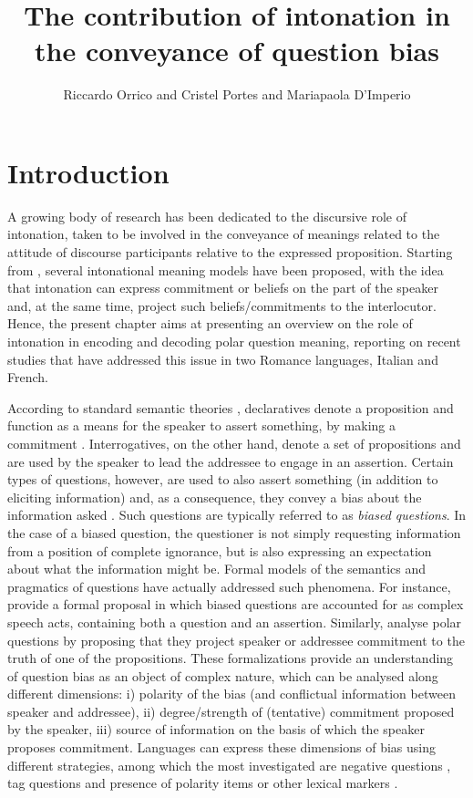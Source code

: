 \documentclass[output=paper,colorlinks,citecolor=brown]{langscibook}
\author{Riccardo Orrico\orcid{0000-0001-9260-7210}\affiliation{Radboud University, Nijmegen} and Cristel Portes\orcid{0000-0002-1764-2945}\affiliation{Aix Marseille Université, Laboratoire Parole et Langage} and Mariapaola D'Imperio\orcid{0000-0001-5122-4555}\affiliation{Aix Marseille Université, Laboratoire Parole et Langage, CNRS}}
\title{The contribution of intonation in the conveyance of question bias}
\begin{document}
\maketitle
\section{Introduction}\label{sec:04:intro}
A growing body of research has been dedicated to the discursive role of intonation, taken to be involved in the conveyance of meanings related to the attitude of discourse participants relative to the expressed proposition. Starting from \citet{pierrehumbert_meaning_1990}, several intonational meaning models have been proposed, with the idea that intonation can express commitment or beliefs on the part of the speaker and, at the same time, project such beliefs/commitments to the interlocutor. Hence, the present chapter aims at presenting an overview on the role of intonation in encoding and decoding polar question meaning, reporting on recent studies that have addressed this issue in two Romance languages, Italian and French.

According to standard semantic theories \citep[e.g.,][]{HAMBLIN1976}, declaratives denote a proposition and function as a means for the speaker to assert something, by making a commitment \citep[among others][]{krifka17}. Interrogatives, on the other hand, denote a set of propositions and are used by the speaker to lead the addressee to engage in an assertion. Certain types of questions, however, are used to also assert something (in addition to eliciting information) and, as a consequence, they convey a bias about the information asked \citep{Dayal2016}. Such questions are typically referred to as \textit{biased questions}. In the case of a biased question, the questioner is not simply requesting information from a position of complete ignorance, but is also expressing an expectation about what the information might be. Formal models of the semantics and pragmatics of questions have actually addressed such phenomena. For instance, \citet{asherreese2007} provide a formal proposal in which biased questions are accounted for as complex speech acts, containing both a question and an assertion. Similarly, \citet{malamud15} analyse polar questions by proposing that they project speaker or addressee commitment to the truth of one of the propositions. These formalizations provide an understanding of question bias as an object of complex nature, which can be analysed along different dimensions: i) polarity of the bias (and conflictual information between speaker and addressee), ii) degree/strength of (tentative) commitment proposed by the speaker, iii) source of information on the basis of which the speaker proposes commitment. Languages can express these dimensions of bias using different strategies, among which the most investigated are negative questions \citep{ladd81, krifka17, arnhold2021}, tag questions \citep{ladd81, asherreese2007, malamud15} and presence of polarity items or other lexical markers \citep{Romero, asherreese2007, Frana, Frana_Rawlins_2019}.
\end{document}
